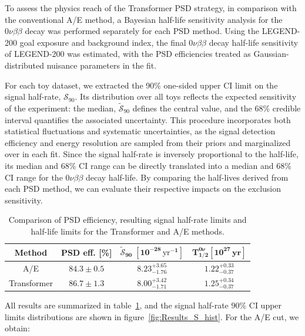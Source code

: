 To assess the physics reach of the Transformer PSD strategy, in comparison with the conventional A/E method, a Bayesian half-life sensitivity analysis for the $0 \nu \beta \beta$ decay was performed separately for each PSD method. Using the LEGEND-200 goal exposure and background index, the final $0 \nu \beta \beta$ decay half-life sensitivity of LEGEND-200 was estimated, with the PSD efficiencies treated as Gaussian-distributed nuisance parameters in the fit.  

For each toy dataset, we extracted the 90\% one-sided upper CI limit on the signal half-rate, $\mathcal{S}_{90}$. Its distribution over all toys reflects the expected sensitivity of the experiment: the median, $\tilde{\mathcal{S}}_{90}$ defines the central value, and the 68\% credible interval quantifies the associated uncertainty. This procedure incorporates both statistical fluctuations and systematic uncertainties, as the signal detection efficiency and energy resolution are sampled from their priors and marginalized over in each fit. 
Since the signal half-rate is inversely proportional to the half-life, its median and $68$\% CI range can be directly translated into a median and $68$\% CI range for the $0 \nu \beta \beta$ decay half-life. By comparing the half-lives derived from each PSD method, we can evaluate their respective impacts on the exclusion sensitivity.

\begin{table}
\centering
\caption{Comparison of PSD efficiency, resulting signal half-rate limits and half-life limits for the Transformer and A/E methods.}
\renewcommand{\arraystretch}{1.5}
\begin{tabular}{|| c | c | c | c ||}
	\hline
 	\textbf{Method} & \textbf{PSD eff. [\%]}  & $\boldsymbol{\tilde{\mathcal{S}}_{90} \; [10^{-28} \,\mathrm{yr}^{-1}]}$ & $\mathbf{T^{0 \nu}_{1/2} [10^{27} \, yr]}$ \\
 	\hline
	A/E & $84.3 \pm 0.5$ & $8.23^{+3.65}_{-1.76}$ & $1.22^{+0.33}_{-0.37}$ \\
 	\hline
 	Transformer & $86.7 \pm 1.3$ & $8.00^{+3.42}_{-1.71}$ & $1.25^{+0.34}_{-0.37}$\\
	\hline
\end{tabular}
\label{tab:Results}
\end{table}

All results are summarized in table~\ref{tab:Results}, and the signal half-rate $90$\% CI upper limits distributions are shown in figure~\ref{fig:Results_S_hist}. For the A/E cut, we obtain:

